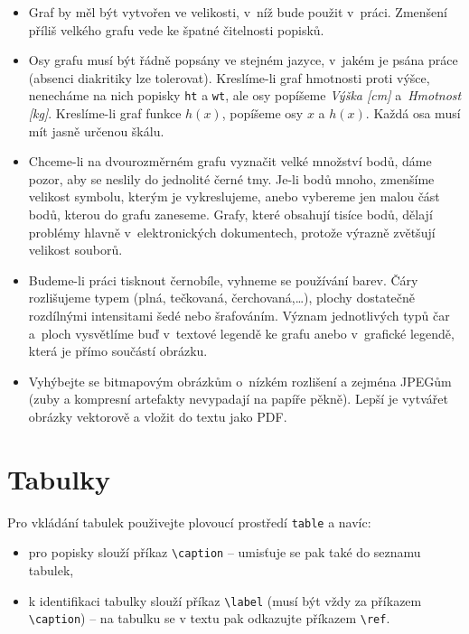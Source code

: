 \begin{itemize}
\item Graf by měl být vytvořen ve velikosti, v~níž bude použit
  v~práci. Zmenšení příliš velkého grafu vede ke špatné čitelnosti
  popisků.
\item Osy grafu musí být řádně popsány ve stejném jazyce, v~jakém je
  psána práce (absenci diakritiky lze tolerovat). Kreslíme-li graf
  hmotnosti proti výšce, nenecháme na nich popisky \texttt{ht} a
  \texttt{wt}, ale osy popíšeme \emph{Výška [cm]} a~\emph{Hmotnost
    [kg]}. Kreslíme-li graf funkce $h(x)$, popíšeme osy $x$ a $h(x)$.
  Každá osa musí mít jasně určenou škálu.
\item Chceme-li na dvourozměrném grafu vyznačit velké množství bodů,
  dáme pozor, aby se neslily do jednolité černé tmy. Je-li bodů mnoho,
  zmenšíme velikost symbolu, kterým je vykreslujeme, anebo vybereme
  jen malou část bodů, kterou do grafu zaneseme. Grafy, které obsahují
  tisíce bodů, dělají problémy hlavně v~elektronických dokumentech,
  protože výrazně zvětšují velikost souborů.
\item Budeme-li práci tisknout černobíle, vyhneme se používání barev.
  Čáry roz\-li\-šu\-je\-me typem (plná, tečkovaná, čerchovaná,\ldots), plochy
  dostatečně roz\-díl\-ný\-mi intensitami šedé nebo šrafováním. Význam
  jednotlivých typů čar a~ploch vysvětlíme buď v~textové legendě ke
  grafu anebo v~grafické legendě, která je přímo součástí obrázku.
\item Vyhýbejte se bitmapovým obrázkům o~nízkém rozlišení a zejména
  JPEGům (zuby a kompresní artefakty nevypadají na papíře pěkně).
  Lepší je vytvářet obrázky vektorově a vložit do textu jako PDF.
\end{itemize}


\section{Tabulky}

Pro vkládání tabulek použivejte plovoucí prostředí \verb|table| a navíc:
\begin{itemize}
\item pro popisky slouží příkaz \verb|\caption| -- umisťuje se pak také do seznamu tabulek,
\item k identifikaci tabulky slouží příkaz \verb|\label| (musí být vždy za příkazem \verb|\caption|) -- na tabulku se v textu pak odkazujte příkazem \verb|\ref|.
\end{itemize}

